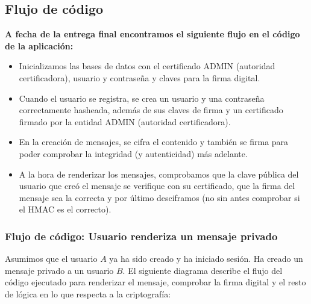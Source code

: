 \documentclass[a4paper,11pt]{article}
\begin{document}
\vspace{0.5cm}

\subsection{Flujo de código}
\textbf{A fecha de la entrega final encontramos el siguiente flujo en el código de la aplicación:} 
\begin{itemize}
    \item Inicializamos las bases de datos con el certificado ADMIN (autoridad certificadora), usuario y contraseña y claves para la firma digital.
    \item Cuando el usuario se registra, se crea un usuario y una contraseña correctamente hasheada, además de sus claves de firma y un certificado firmado por la entidad ADMIN (autoridad certificadora).
    \item En la creación de mensajes, se cifra el contenido y también se firma para poder comprobar la integridad (y autenticidad) más adelante.
    \item A la hora de renderizar los mensajes, comprobamos que la clave pública del usuario que creó el mensaje se verifique con su certificado, que la firma del mensaje sea la correcta y por último desciframos (no sin antes comprobar si el HMAC es el correcto).
\end{itemize}

\subsubsection{Flujo de código: Usuario renderiza un mensaje privado}

Asumimos que el usuario $A$ ya ha sido creado y ha iniciado sesión. Ha creado un mensaje privado a un usuario $B$. El siguiente diagrama describe el flujo del código ejecutado para renderizar el mensaje, comprobar la firma digital y el resto de lógica en lo que respecta a la criptografía:
\end{document}
